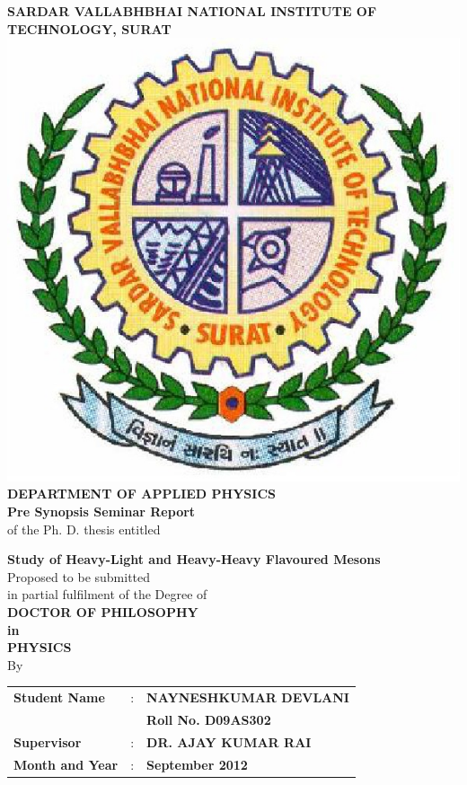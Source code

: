 \documentclass[draft,11pt]{scrreprt}
\begin{document}
\pagestyle{empty}
\begin{center}
\large\textbf{{SARDAR VALLABHBHAI NATIONAL INSTITUTE OF TECHNOLOGY, SURAT}}\\
\vfill
\includegraphics[scale=0.25]{svnit}\\ \vfill
\textbf{DEPARTMENT OF APPLIED PHYSICS}\\ \vfill
\textbf{Pre Synopsis Seminar Report}\\  \vfill
\normalsize
of the Ph. D. thesis entitled\\ \vfill

\large
\textbf{Study of Heavy-Light and Heavy-Heavy Flavoured Mesons}\\
\vfill
\normalsize
Proposed to be submitted\\
in partial fulfilment of the Degree of\\
\vfill
\textbf{DOCTOR OF PHILOSOPHY\\ in \\ PHYSICS}\\
\vfill By\\

\begin{tabular}{lcl}
\textbf{Student Name} & : & {\textbf{NAYNESHKUMAR DEVLANI}} \\
& & \textbf{Roll No. D09AS302} \\
\textbf{Supervisor} & : & \textbf{DR. AJAY KUMAR RAI}\\
\textbf{Month and Year} & : & \textbf{September 2012}



\end{tabular}
\end{center}
\end{document}
